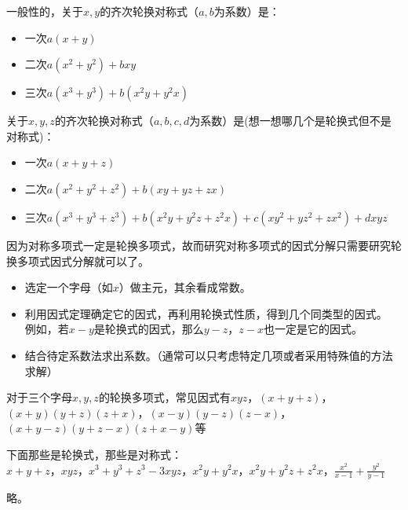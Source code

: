 \documentclass[windows,csize4]{BHCexam}
\begin{document}
\begin{groups}
    一般性的，关于$x,y$的齐次轮换对称式（$a,b$为系数）是：
    \begin{itemize}
        \item 一次$a(x+y)$
        \item 二次$a(x^2+y^2)+bxy$
        \item 三次$a(x^3+y^3)+b(x^2y+y^2x)$
    \end{itemize}
    关于$x,y,z$的齐次轮换对称式（$a,b,c,d$为系数）是(想一想哪几个是轮换式但不是对称式)：
    \begin{itemize}
        \item 一次$a(x+y+z)$
        \item 二次$a(x^2+y^2+z^2)+b(xy+yz+zx)$
        \item 三次$a(x^3+y^3+z^3)+b(x^2y+y^2z+z^2x)+c(xy^2+yz^2+zx^2)+dxyz$
    \end{itemize}

    因为对称多项式一定是轮换多项式，故而研究对称多项式的因式分解只需要研究轮换多项式因式分解就可以了。
    \begin{itemize}
        \item 选定一个字母（如$x$）做主元，其余看成常数。
        \item 利用因式定理确定它的因式，再利用轮换式性质，得到几个同类型的因式。
              例如，若$x-y$是轮换式的因式，那么$y-z$，$z-x$也一定是它的因式。
        \item 结合待定系数法求出系数。（通常可以只考虑特定几项或者采用特殊值的方法求解）
    \end{itemize}
    对于三个字母$x,y,z$的轮换多项式，常见因式有$xyz$，$(x+y+z)$，$(x+y)(y+z)(z+x)$，$(x-y)(y-z)(z-x)$，
    $(x+y-z)(y+z-x)(z+x-y)$等


    \begin{questions}[]
        \question[5] 下面那些是轮换式，那些是对称式：\\
        $x+y+z$，$xyz$，$x^3+y^3+z^3-3xyz$，$x^2y+y^2x$，$x^2y+y^2z+z^2x$，$\frac{x^2}{x-1}+\frac{y^2}{y-1}$
        \begin{solution}{0.5cm}
            \methodonly 略。
        \end{solution}
        \vspace{3.5cm}


\end{questions}
\end{groups}
\end{document}
